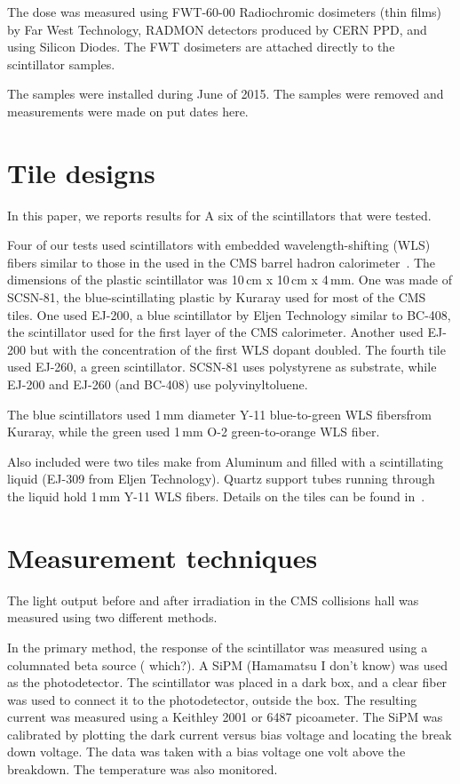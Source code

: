 \documentclass[review]{elsarticle}
\begin{document}
The dose was measured using FWT-60-00 Radiochromic dosimeters (thin films) by Far West Technology, RADMON detectors produced by CERN PPD,  and using Silicon Diodes.  The FWT dosimeters are attached directly to the scintillator samples.


The samples were installed during June of 2015.  The samples were removed
and measurements were made on {\color{red} put dates here}.

\section{Tile designs}
\label{sec:design}

In this paper, we reports results for A six of the scintillators that were tested.

Four of our tests used scintillators with embedded wavelength-shifting (WLS) fibers similar to those in the used in the CMS barrel hadron calorimeter~\cite{CMSHB}.  The dimensions of the plastic scintillator was
10\,cm x 10\,cm x 4\,mm.
One was made of SCSN-81, the blue-scintillating plastic by Kuraray
used for most of the
CMS tiles.  One used EJ-200, a blue scintillator by
Eljen Technology similar to BC-408, the scintillator used for the
first layer of the CMS calorimeter.  Another used EJ-200 but with
the concentration of the first WLS dopant doubled.  The fourth
tile used EJ-260, a green scintillator.
SCSN-81 uses polystyrene as substrate, while EJ-200 and EJ-260
(and BC-408) use polyvinyltoluene.

The blue scintillators used 1\,mm diameter Y-11 blue-to-green
WLS fibersfrom Kuraray,
while the green used 1\,mm O-2 green-to-orange WLS fiber.

Also included were two tiles make from Aluminum and filled with a scintillating liquid (EJ-309 from Eljen Technology).
Quartz support tubes running through the liquid hold 1\,mm Y-11 WLS fibers.
Details on the tiles can be found in~\cite{mdliquidtile}.


\section{Measurement techniques}
\label{sec:techniques}

The light output before and after irradiation in the CMS collisions hall
was measured using two different methods.

In the primary method, the response
of the scintillator was measured 
using a columnated beta source ({\color{red} which?}).
A SiPM (Hamamatsu {\color{red} I don't know}) was used as the photodetector.
The scintillator was placed in a dark box, and a clear fiber was used
to connect it to the photodetector, outside the box.
The resulting current was measured using a Keithley 2001 or 6487 picoameter.
The SiPM was calibrated by plotting the dark current versus bias voltage and locating the break down voltage.  The data was taken with a bias voltage one volt above the breakdown.   The temperature was also monitored.
\end{document}
